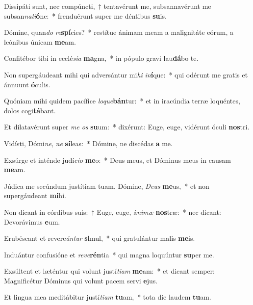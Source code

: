\item Dissipáti sunt, nec compúncti,~† tentavérunt me, subsannavérunt me subsan\textit{na}\textit{ti}\textbf{ó}ne:~* frenduérunt super me déntibus \textbf{su}is.
\item Dómine, quan\textit{do} \textit{re}\textbf{spí}cies?~* restítue ánimam meam a malignitáte eórum, a leónibus únicam \textbf{me}am.
\item Confitébor tibi in ecclé\textit{si}\textit{a} \textbf{ma}gna,~* in pópulo gravi lau\textbf{dá}bo te.
\item Non supergáudeant mihi qui adversántur mi\textit{hi} \textit{in}\textbf{í}que:~* qui odérunt me gratis et ánnuunt \textbf{ó}culis.
\item Quóniam mihi quidem pacífice \textit{lo}\textit{que}\textbf{bán}tur:~* et in iracúndia terræ loquéntes, dolos cogi\textbf{tá}bant.
\item Et dilatavérunt super \textit{me} \textit{os} \textbf{su}um:~* dixérunt: Euge, euge, vidérunt óculi \textbf{nos}tri.
\item Vidísti, Dómi\textit{ne}, \textit{ne} \textbf{sí}leas:~* Dómine, ne discédas \textbf{a} me.
\item Exsúrge et inténde judí\textit{ci}\textit{o} \textbf{me}o:~* Deus meus, et Dóminus meus in causam \textbf{me}am.
\item Júdica me secúndum justítiam tuam, Dómine, \textit{De}\textit{us} \textbf{me}us,~* et non supergáudeant \textbf{mi}hi.
\item Non dicant in córdibus suis:~† Euge, euge, á\textit{ni}\textit{mæ} \textbf{nos}træ:~* nec dicant: Devorávimus \textbf{e}um.
\item Erubéscant et revere\textit{án}\textit{tur} \textbf{si}mul,~* qui gratulántur malis \textbf{me}is.
\item Induántur confusióne et \textit{re}\textit{ve}\textbf{rén}tia~* qui magna loquúntur \textbf{su}per me.
\item Exsúltent et læténtur qui volunt justí\textit{ti}\textit{am} \textbf{me}am:~* et dicant semper: Magnificétur Dóminus qui volunt pacem servi \textbf{e}jus.
\item Et lingua mea meditábitur justí\textit{ti}\textit{am} \textbf{tu}am,~* tota die laudem \textbf{tu}am.
